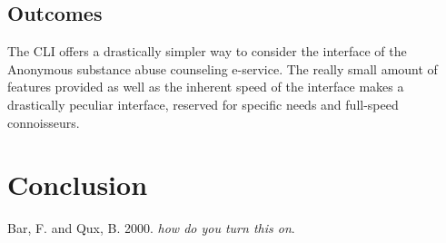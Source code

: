 \documentclass[a4paper,12pt, twocolumn]{article}
\begin{document}
\subsection*{Outcomes}

The CLI offers a drastically simpler way to consider the interface of the Anonymous substance abuse counseling e-service. The really small amount of features provided as well as the inherent speed of the interface makes a drastically peculiar interface, reserved for specific needs and full-speed connoisseurs.

\section*{Conclusion}

\begin{thebibliography}{9}

  Bar, F. and Qux, B. 2000. \emph{how do you turn this on}.	%
  
\end{thebibliography}
\end{document}
